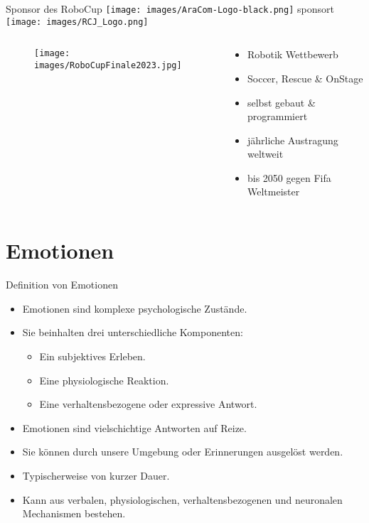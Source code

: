 \documentclass[aspectratio=169]{beamer}
\begin{document}
\begin{frame}{Sponsor des RoboCup}
  \texttt{[image: images/AraCom-Logo-black.png]} sponsort
  \texttt{[image: images/RCJ\_Logo.png]}
  \begin{columns}
    \begin{column}{0.45\textwidth}
      \begin{figure}[h]
        \centering
        \texttt{[image: images/RoboCupFinale2023.jpg]}
      \end{figure}
    \end{column}
    \begin{column}{0.45\textwidth}
      \begin{itemize}
        \item Robotik Wettbewerb
        \item Soccer, Rescue \& OnStage
        \item selbst gebaut \& programmiert
        \item jährliche Austragung weltweit
        \item bis 2050 gegen Fifa Weltmeister
      \end{itemize}
    \end{column}
  \end{columns}
\end{frame}

\section{Emotionen}
\begin{frame}{Definition von Emotionen}
  \begin{itemize}
    \item Emotionen sind komplexe psychologische Zustände.
    \item Sie beinhalten drei unterschiedliche Komponenten:
          \begin{itemize}
            \item Ein subjektives Erleben.
            \item Eine physiologische Reaktion.
            \item Eine verhaltensbezogene oder expressive Antwort.
          \end{itemize}
    \item Emotionen sind vielschichtige Antworten auf Reize.
    \item Sie können durch unsere Umgebung oder Erinnerungen ausgelöst werden.
    \item Typischerweise von kurzer Dauer.
    \item Kann aus verbalen, physiologischen, verhaltensbezogenen und neuronalen Mechanismen bestehen.
  \end{itemize}
\end{frame}
\end{document}
